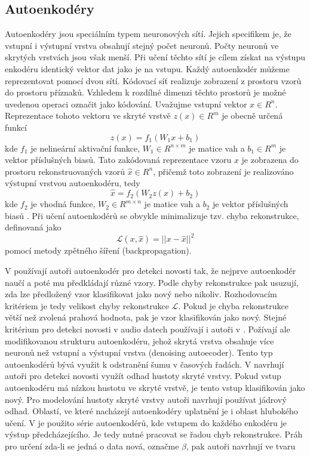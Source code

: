 \subsection{Autoenkodéry}
Autoenkodéry jsou speciálním typem neuronových sítí. Jejich specifikem je, že vstupní i výstupní vrstva obsahují stejný počet neuronů. Počty neuronů ve skrytých vrstvách jsou však menší. Při učení těchto sítí je cílem získat na výstupu enkodéru identický vektor dat jako je na vstupu. Každý autoenkodér můžeme reprezentovat pomocí dvou sítí. Kódovací síť realizuje zobrazení z prostoru vzorů do prostoru příznaků. Vzhledem k rozdílné dimenzi těchto prostorů je možné uvedenou operaci označit jako kódování. Uvažujme vstupní vektor $x \in R^n$. Reprezentace tohoto vektoru ve skryté vrstvě $z(x)\in R^m$ je obecně určená funkcí 
\begin{equation}
z(x)=f_1(W_1 x+b_1) 
\end{equation}
kde $f_1$ je nelineární aktivační funkce, $W_1 \in R^{n\times m}$ je matice vah a $b_1 \in R^m$ je vektor příslušných biasů. Tato zakódovaná reprezentace vzoru $x$ je zobrazena do prostoru rekonstruovaných vzorů $\hat{x}\in R^n$, přičemž toto zobrazení je realizováno výstupní vrstvou autoenkodéru, tedy
\begin{equation}
\hat{x}=f_2(W_2z(x)+b_2)
\end{equation}
kde $f_2$ je vhodná funkce, $W_2\in R^{m \times n}$ je matice vah a $b_2$ je vektor příslušných biasů \cite{auto1}. Při učení autoenkodérů se obvykle minimalizuje tzv. chyba rekonstrukce, definovaná jako
\begin{equation}
\mathcal{L}(x,\hat{x})= \lvert\lvert x - \hat{x}\rvert \rvert^2
\end{equation}
pomocí metody zpětného šíření (backpropagation).
\par 
V \cite{auto2} používají autoři autoenkodér pro detekci novosti tak, že nejprve autoenkodér naučí a poté mu předkládají různé vzory. Podle chyby rekonstrukce pak usuzují, zda lze předložený vzor klasifikovat jako nový nebo nikoliv. Rozhodovacím kritériem je tedy velikost chyby rekonstrukce $\mathcal{L}$. Pokud je chyba rekonstrukce větší než zvolená prahová hodnota, pak je vzor klasifikován jako nový. Stejné kritérium pro detekci novosti v audio datech používají i autoři v \cite{auto3}. Požívají ale modifikovanou strukturu autoenkodéru, jehož skrytá vrstva obsahuje více neuronů než vstupní a výstupní vrstva (denoising autoecoder). Tento typ autoenkodérů bývá využit k odstranění šumu v časových řadách.
V \cite {auto1} navrhují autoři pro detekci novosti využít odhad hustoty skryté vrstvy. Pokud vstup autoenkodéru má nízkou hustotu ve skryté vrstvě, je tento vstup klasifikován jako nový. Pro modelování hustoty skryté vrstvy autoři navrhují používat jádrový odhad. Oblastí, ve které nacházejí autoenkodéry uplatnění je i oblast hlubokého učení. V \cite{auto4} je použito série autoenkodérů, kde vstupem do každého enkodéru je výstup předcházejícího. Je tedy nutné pracovat se řadou chyb rekonstrukce. Práh pro určení zda-li se jedná o data nová, označme $\beta$, pak autoři navrhují ve tvaru
